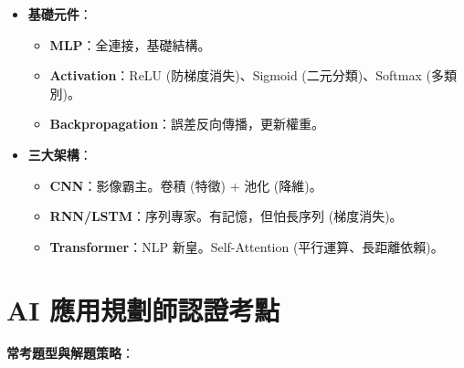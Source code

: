 \documentclass[
  letterpaper,
  DIV=11,
  numbers=noendperiod]{scrreprt}
\providecommand{\tightlist}{%
  \setlength{\itemsep}{0pt}\setlength{\parskip}{0pt}}
\begin{document}
\begin{itemize}
\tightlist
\item
  \textbf{基礎元件}：

  \begin{itemize}
  \tightlist
  \item
    \textbf{MLP}：全連接，基礎結構。
  \item
    \textbf{Activation}：ReLU (防梯度消失)、Sigmoid (二元分類)、Softmax
    (多類別)。
  \item
    \textbf{Backpropagation}：誤差反向傳播，更新權重。
  \end{itemize}
\item
  \textbf{三大架構}：

  \begin{itemize}
  \tightlist
  \item
    \textbf{CNN}：影像霸主。卷積 (特徵) + 池化 (降維)。
  \item
    \textbf{RNN/LSTM}：序列專家。有記憶，但怕長序列 (梯度消失)。
  \item
    \textbf{Transformer}：NLP 新皇。Self-Attention
    (平行運算、長距離依賴)。
  \end{itemize}
\end{itemize}

\section{AI
應用規劃師認證考點}\label{ai-ux61c9ux7528ux898fux5283ux5e2bux8a8dux8b49ux8003ux9ede-6}

\textbf{常考題型與解題策略}：
\end{document}
